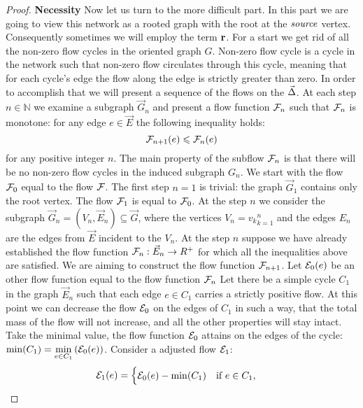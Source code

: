 \documentclass[12pt]{article}
\begin{document}
\begin{proof}
      \noindent\textbf{Necessity}
      Now let us turn to the more difficult part.
      In this part we are going to view this network as a rooted graph with the root at the $\source$ vertex.
      Consequently sometimes we will employ the term $\root$.
      For a start we get rid of all the non-zero flow cycles in the oriented graph $G$.
      Non-zero flow cycle is a cycle in the network such that non-zero flow circulates through this cycle,
      meaning that for each cycle's edge the flow along the edge is strictly greater than zero.
      In order to accomplish that we will present a sequence of the flows on the $\onet$.
      At each step $n \in \mathbb{N}$ we examine a subgraph $\vec{G}_n$ and present a flow function $\flowposn{n}$
        such that $\flowposn{n}$ is monotone: for any edge $e \in \vec{E}$ the following inequality holds:
      \[
        \flowposn{n+1}(e) \leq \flowposn{n}(e)
      \]
      for any positive integer $n$.
      The main property of the subflow $\flowposn{n}$ is that there will be no non-zero flow cycles in the induced subgraph
      $G_n$.
      We start with the flow $\flowposn{0}$ equal to the flow $\flowpos$.
      The first step $n = 1$ is trivial: the graph $\vec{G}_1$ contains only the root vertex.
      The flow $\flowposn{1}$ is equal to $\flowposn{0}$.
      At the step $n$ we consider the subgraph $\vec{G}_n = (V_n, \vec{E}_n) \subseteq \vec{G}$, where the vertices
        $V_n = {v_k}_{k=1}^n$ and the edges $E_n$ are the edges from $\vec{E}$ incident to the $V_n$.
      At the step $n$ suppose we have already established the flow function $\flowposn{n}: \vec{E}_{n} \to R^{+}$ for which
        all the inequalities above are satisfied.
      We are aiming to construct the flow function $\flowposn{n+1}$.
      Let $\cal{E}_0(e)$ be an other flow function  equal to the flow function $\flowposn{n}$
      Let there be a simple cycle $C_1$ in the graph $\vec{E}_n$ such that each edge $e \in C_1$ carries
        a strictly positive flow.
      At this point we can decrease the flow $\cal{E}_0$ on the edges of $C_1$ in such a way, that the total mass
        of the flow will not increase, and all the other properties will stay intact.
      Take the minimal value, the flow function $\cal{E}_0$
        attains on the edges of the cycle: $\displaystyle\min(C_1) = \min_{e \in C_1}\left(\cal{E}_0(e)\right)$.
      Consider a adjusted flow $\cal{E}_1$:
      \begin{equation*}
        \cal{E}_1(e) =
        \begin{cases}
          \cal{E}_0(e) - \min(C_1) \quad \text{if } e \in C_1,\\

\end{cases}
\end{equation*}
\end{proof}
\end{document}
